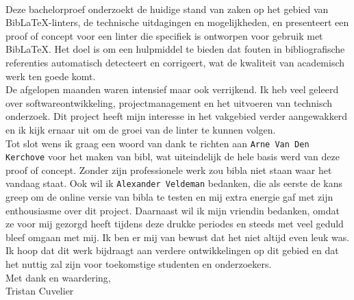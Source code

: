 \\ \newline{}
Deze bachelorproef onderzoekt de huidige stand van zaken op het gebied van BibLaTeX-linters, de technische uitdagingen en mogelijkheden, en presenteert een proof of concept voor een linter die specifiek is ontworpen voor gebruik met BibLaTeX. Het doel is om een hulpmiddel te bieden dat fouten in bibliografische referenties automatisch detecteert en corrigeert, wat de kwaliteit van academisch werk ten goede komt.
\\ \newline{}
De afgelopen maanden waren intensief maar ook verrijkend. Ik heb veel geleerd over softwareontwikkeling, projectmanagement en het uitvoeren van technisch onderzoek. Dit project heeft mijn interesse in het vakgebied verder aangewakkerd en ik kijk ernaar uit om de groei van de linter te kunnen volgen.
\\ \newline{}
Tot slot wens ik graag een woord van dank te richten aan \texttt{Arne Van Den Kerchove} voor het maken van bibl, wat uiteindelijk de hele basis werd van deze proof of concept. Zonder zijn professionele werk zou bibla niet staan waar het vandaag staat. Ook wil ik \texttt{Alexander Veldeman} bedanken, die als eerste de kans greep om de online versie van bibla te testen en mij extra energie gaf met zijn enthousiasme over dit project. Daarnaast wil ik mijn vriendin bedanken, omdat ze voor mij gezorgd heeft tijdens deze drukke periodes en steeds met veel geduld bleef omgaan met mij. Ik ben er mij van bewust dat het niet altijd even leuk was.
\\ \newline{}
Ik hoop dat dit werk bijdraagt aan verdere ontwikkelingen op dit gebied en dat het nuttig zal zijn voor toekomstige studenten en onderzoekers.
\\ \newline{}
Met dank en waardering,
\\ \newline{}
Tristan Cuvelier
